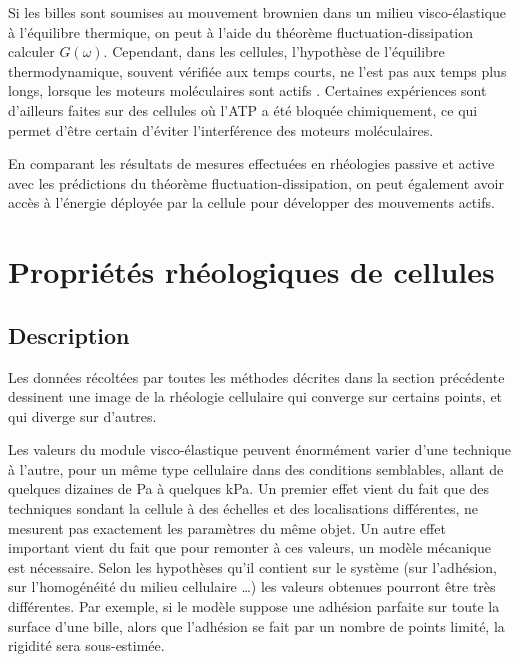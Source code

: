 Si les billes sont soumises au mouvement brownien dans un milieu visco-élastique à l'équilibre thermique, on peut à l'aide du théorème fluctuation-dissipation calculer $G(\omega)$. 
Cependant, dans les cellules, l'hypothèse de l'équilibre thermodynamique, souvent vérifiée aux temps courts, ne l'est pas aux temps plus longs, lorsque les moteurs moléculaires sont actifs \parencite{mizuno_nonequilibrium_2007}. 
Certaines expériences sont d'ailleurs faites sur des cellules où l'ATP a été bloquée chimiquement, ce qui permet d'être certain d'éviter l'interférence des moteurs moléculaires. 

En comparant les résultats de mesures effectuées en rhéologies passive et active avec les prédictions du théorème fluctuation-dissipation, on peut également avoir accès à l'énergie déployée par la cellule pour développer des mouvements actifs. 



\section{Propriétés rhéologiques de cellules}

\subsection{Description}

Les données récoltées par toutes les méthodes décrites dans la section précédente dessinent une image de la rhéologie cellulaire qui converge sur certains points, et qui diverge sur d'autres. 

Les valeurs du module visco-élastique peuvent énormément varier d'une technique à l'autre, pour un même type cellulaire dans des conditions semblables, allant de quelques dizaines de Pa à quelques kPa. 
Un premier effet vient du fait que des techniques sondant la cellule à des échelles et des localisations différentes, ne mesurent pas exactement les paramètres du même objet. 
Un autre effet important vient du fait que pour remonter à ces valeurs, un modèle mécanique est nécessaire. Selon les hypothèses qu'il contient sur le système (sur l'adhésion, sur l'homogénéité du milieu cellulaire \dots) les valeurs obtenues pourront être très différentes. 
Par exemple, si le modèle suppose une adhésion parfaite sur toute la surface d'une bille, alors que l'adhésion se fait par un nombre de points limité, la rigidité sera sous-estimée. 

